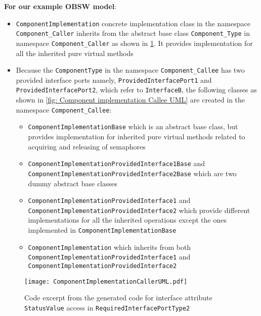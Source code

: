 \textbf{For our example OBSW model}:
\begin{itemize}
\item \texttt{Component\allowbreak Implementation} concrete implementation class in the namespace \texttt{Component\_Caller} inherits from the abstract base class \texttt{Component\_Type} in namespace \texttt{Component\allowbreak\_Caller} as shown in \cref{fig: Component implementation Caller UML}. It provides implementation for all the inherited pure virtual methods
\item Because the \texttt{ComponentType} in the namespace \texttt{Component\_Callee} has two provided interface ports namely, \texttt{Provided\allowbreak Interface\allowbreak Port1} and \texttt{Provided\allowbreak Interface\allowbreak Port2}, which refer to \texttt{InterfaceB}, the following classes as shown in \cref{fig: Component implementation Callee UML} are created in the namespace \texttt{Component\_Callee}:
\begin{itemize}
\item \texttt{ComponentImplementation\allowbreak Base} which is an abstract base class, but provides implementation for inherited pure virtual methods related to acquiring and releasing of semaphores
\item \texttt{Component\allowbreak Implementation\allowbreak Provided\allowbreak Interface1\allowbreak Base} and \texttt{Component\allowbreak Implemen\allowbreak tation\allowbreak Provided\allowbreak Interface2\allowbreak Base} which are two dummy abstract base classes
\item \texttt{Component\allowbreak Implementation\allowbreak Provided\allowbreak Interface1} and \texttt{Component\allowbreak Impl\allowbreak emen\allowbreak tation\allowbreak Provided\allowbreak Interface2} which provide different implementations for all the inherited operations except the ones implemented in \texttt{Component\allowbreak Implementation\allowbreak Base}
\item \texttt{Component\allowbreak Implementation} which inherits from both \texttt{Component\allowbreak Implemen\allowbreak tation\allowbreak Provided\allowbreak Interface1} and \texttt{Component\allowbreak Implementation\allowbreak Provided\allowbreak Inter\allowbreak face2}
\end{itemize}   
\end{itemize}

\begin{figure}[h]
	\centering
	\texttt{[image: ComponentImplementationCallerUML.pdf]}
	\caption{Code excerpt from the generated code for interface attribute \texttt{StatusValue} access in \texttt{Required\allowbreak InterfacePort\allowbreak Type2}}
	\label{fig: Component implementation Caller UML}
\end{figure} 

